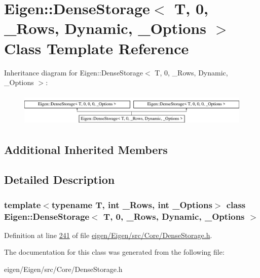 \hypertarget{class_eigen_1_1_dense_storage_3_01_t_00_010_00_01___rows_00_01_dynamic_00_01___options_01_4}{}\section{Eigen\+:\+:Dense\+Storage$<$ T, 0, \+\_\+\+Rows, Dynamic, \+\_\+\+Options $>$ Class Template Reference}
\label{class_eigen_1_1_dense_storage_3_01_t_00_010_00_01___rows_00_01_dynamic_00_01___options_01_4}
Inheritance diagram for Eigen\+:\+:Dense\+Storage$<$ T, 0, \+\_\+\+Rows, Dynamic, \+\_\+\+Options $>$\+:\begin{figure}[H]
\begin{center}
\leavevmode
\includegraphics[height=1.609195cm]{class_eigen_1_1_dense_storage_3_01_t_00_010_00_01___rows_00_01_dynamic_00_01___options_01_4}
\end{center}
\end{figure}
\subsection*{Additional Inherited Members}


\subsection{Detailed Description}
\subsubsection*{template$<$typename T, int \+\_\+\+Rows, int \+\_\+\+Options$>$\newline
class Eigen\+::\+Dense\+Storage$<$ T, 0, \+\_\+\+Rows, Dynamic, \+\_\+\+Options $>$}



Definition at line \hyperlink{eigen_2_eigen_2src_2_core_2_dense_storage_8h_source_l00241}{241} of file \hyperlink{eigen_2_eigen_2src_2_core_2_dense_storage_8h_source}{eigen/\+Eigen/src/\+Core/\+Dense\+Storage.\+h}.



The documentation for this class was generated from the following file\+:\begin{DoxyCompactItemize}
\item 
eigen/\+Eigen/src/\+Core/\+Dense\+Storage.\+h\end{DoxyCompactItemize}
